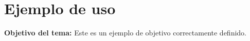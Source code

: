 \documentclass[11pt]{article}
\newcommand{\objetivo}[1]{%
  \noindent\textbf{Objetivo del tema:} #1\par
}
\begin{document}
\section*{Ejemplo de uso}
\objetivo{Este es un ejemplo de objetivo correctamente definido.}
\end{document}
